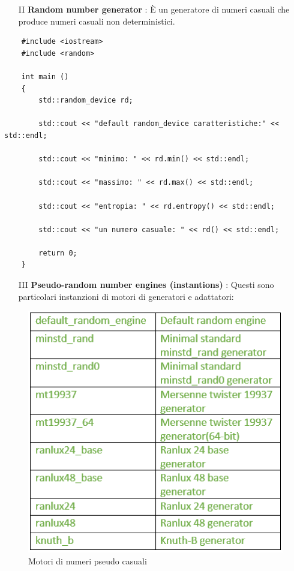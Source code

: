 \begin{enumerate}[I]
	\item[II] \textsf{\small \textbf{Random number generator} : È un generatore di numeri casuali che produce numeri casuali non deterministici.} \\
\end{enumerate}

\begin{lstlisting}
	#include <iostream>
	#include <random>
	
	int main ()
	{
		std::random_device rd;
		
		std::cout << "default random_device caratteristiche:" << std::endl;
		
		std::cout << "minimo: " << rd.min() << std::endl;
		
		std::cout << "massimo: " << rd.max() << std::endl;
		
		std::cout << "entropia: " << rd.entropy() << std::endl;
		
		std::cout << "un numero casuale: " << rd() << std::endl;
		
		return 0;
	}
\end{lstlisting}

\begin{enumerate}[I]
	\item[III] \textsf{\small \textbf{Pseudo-random number engines (instantions)} : Questi sono particolari instanzioni di motori di generatori e adattatori: } \\
\end{enumerate}

\begin{figure}[ht]
	\centering
	\includegraphics[width=1\textwidth, height=1\textheight, keepaspectratio]{./imgs/pseudo-random-number-engines.png}
	\caption{Motori di numeri pseudo casuali}
	\label{fig:pseudo-random-number-engines}
\end{figure}

